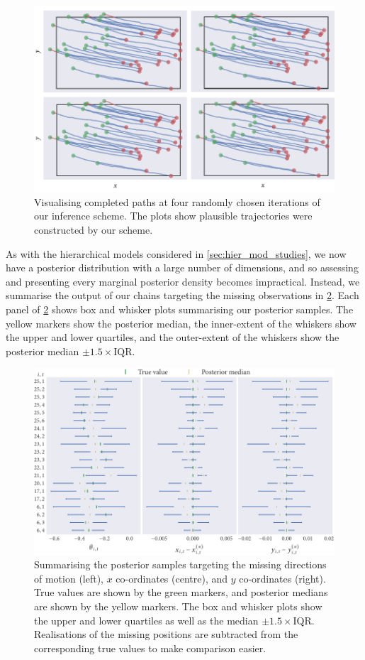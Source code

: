 \begin{figure}[tbp]
  \includegraphics{beg/paths.pdf}
  \caption{Visualising completed paths at four randomly chosen iterations
  of our inference scheme. The plots show plausible trajectories were
  constructed by our scheme.}
  \label{fig:beg_paths}
\end{figure}

As with the hierarchical models considered in \cref{sec:hier_mod_studies}, we
now have a posterior distribution with a large number of dimensions, and so
assessing and presenting every marginal posterior density becomes impractical.
Instead, we summarise the output of our chains targeting the missing
observations in \cref{fig:beg_summary}. Each panel of \cref{fig:beg_summary}
shows box and whisker plots summarising our posterior samples. The yellow
markers show the posterior median, the inner-extent of the whiskers show the
upper and lower quartiles, and the outer-extent of the whiskers show the
posterior median $\pm1.5\times\text{IQR}$.

\begin{figure}[tbp]
  \includegraphics{beg/summary.pdf}
  \caption{Summarising the posterior samples targeting the missing directions
  of motion (left), $x$ co-ordinates (centre), and $y$ co-ordinates (right).
  True values are shown by the green markers, and posterior medians are shown
  by the yellow markers. The box and whisker plots show the upper and lower
  quartiles as well as the median $\pm1.5\times\text{IQR}$. Realisations of the
  missing positions are subtracted from the corresponding true values to make
  comparison easier.}
  \label{fig:beg_summary}
\end{figure}

